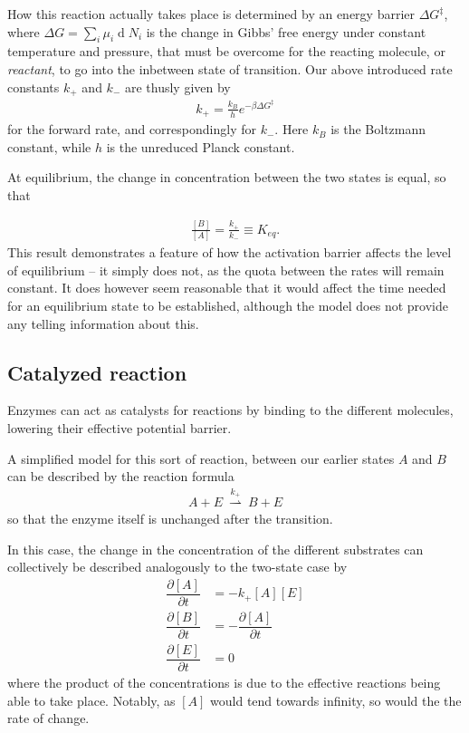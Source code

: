 \documentclass[a4paper,12pt]{article}
\newcommand{\partt}[2]{\ensuremath{\dfrac{\partial {#1}}{\partial {#2}}}}
\renewcommand{\d}[1]{\ensuremath{\operatorname{d}\!{#1}}} %
\theoremstyle{plain}
\theoremstyle{definition}
\begin{document}
      How this reaction actually takes place is determined by an energy barrier
      $\Delta G^{\ddagger}$, where $\Delta G = \sum_i \mu_i \d N_i$ is the change
      in Gibbs' free energy under constant temperature and pressure, that must be overcome 
      for the reacting molecule, or \emph{reactant}, to go into the inbetween state 
      of transition. Our above introduced rate constants $k_+$ and $k_-$ are thusly 
      given by 
      \begin{align}
         k_+ = \frac{k_B}{h} e^{-\beta\Delta G^{\ddagger}}
         \label{eq:k_def}
      \end{align}
      for the forward rate, and correspondingly for $k_-$. Here $k_B$ is the
      Boltzmann constant, while $h$ is the unreduced Planck constant.

      At equilibrium, the change in concentration between the two states is equal,
      so that 

         \begin{align}
            \frac{[B]}{[A]} = \frac{k_+}{k_-} \equiv K_{eq}. 
            \label{eq:K_eq_def}
         \end{align}
      This result demonstrates a feature of how the activation barrier affects
      the level of equilibrium -- it simply does not, as the quota between the
      rates will remain constant. It does however seem reasonable that it would affect
      the time needed for an equilibrium state to be established, although the
      model does not provide any telling information about this. 

   \subsection{Catalyzed reaction}
      Enzymes can act as catalysts for reactions by binding to the different
      molecules, lowering their effective potential barrier. 
      
      A simplified model for this sort of reaction, between our earlier states 
      $A$ and $B$ can be described by the reaction formula
         \begin{align}
            A + E~\stackrel{k_+}{\rightharpoonup}~B + E
            \label{eq:enzymes}
         \end{align}
      so that the enzyme itself is unchanged after the transition. 
     
      In this case, the change in the concentration of the different substrates
      can collectively be described analogously to the two-state case by
         \begin{align*}
            \partt{[A]}{t} &= -k_+[A][E] \\
            \partt{[B]}{t} &= - \partt{[A]}{t} \\
            \partt{[E]}{t} &= 0
         \end{align*}
      where the product of the concentrations is due to the effective reactions
      being able to take place. Notably, as $[A]$ would tend towards infinity,
      so would the the rate of change. 
      
\end{document}
